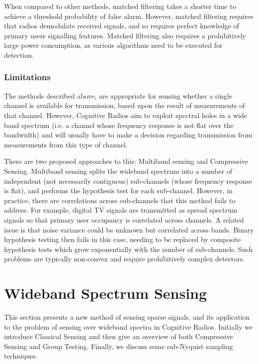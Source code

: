 When compared to other methods, matched filtering takes a shorter time to achieve a threshold probability of false alarm. However, matched filtering requires that radios demodulate received signals, and so requires perfect knowledge of primary users signalling features. Matched filtering also requires a prohibitively large power consumption, as various algorithms need to be executed for detection.

\subsubsection{Limitations}
The methods described above, are appropriate for sensing whether a single channel is available for transmission, based upon the result of measurements of that channel. However, Cognitive Radios aim to exploit spectral holes in a wide band spectrum (i.e. a channel whose frequency response is not flat over the bandwidth) and will usually have to make a decision regarding transmission from measurements from this type of channel.

There are two proposed approaches to this: Multiband sensing and Compressive Sensing. Multiband sensing splits the wideband spectrum into a number of independent (not necessarily contiguous) sub-channels (whose frequency response is flat), and performs the hypothesis test for each sub-channel. However, in practice, there are correlations across sub-channels that this method fails to address. For example, digital TV signals are transmitted as spread spectrum signals so that primary user occupancy is correlated across channels. A related issue is that noise variance could be unknown but correlated across bands. Binary hypothesis testing then fails in this case, needing to be replaced by composite hypothesis tests which grow exponentially with the number of sub-channels. Such problems are typically non-convex and require prohibitively complex detectors.

\section{Wideband Spectrum Sensing}
This section presents a new method of sensing sparse signals, and its application to the problem of sensing over wideband spectra in Cognitive Radios. Initially we introduce Classical Sensing and then give an overview of both Compressive Sensing and Group Testing. Finally, we discuss some sub-Nyquist sampling techniques.

